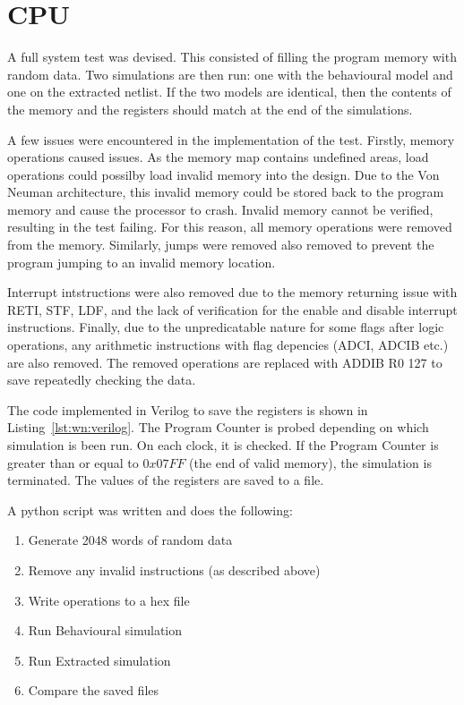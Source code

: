
\section{CPU}

A full system test was devised. 
This consisted of filling the program memory with random data. 
Two simulations are then run: one with the behavioural model and one on the extracted netlist. 
If the two models are identical, then the contents of the memory and the registers should match at the end of the simulations.

A few issues were encountered in the implementation of the test.
Firstly, memory operations caused issues. 
As the memory map contains undefined areas, load operations could possilby load invalid memory into the design.
Due to the Von Neuman architecture, this invalid memory could be stored back to the program memory and cause the processor to crash. 
Invalid memory cannot be verified, resulting in the test failing. 
For this reason, all memory operations were removed from the memory.
Similarly, jumps were removed also removed to prevent the program jumping to an invalid memory location. 

Interrupt intstructions were also removed due to the memory returning issue with RETI, STF, LDF, and the lack of verification for the enable and disable interrupt instructions. 
Finally, due to the unpredicatable nature for some flags after logic operations, any arithmetic instructions with flag depencies (ADCI, ADCIB etc.) are also removed. 
The removed operations are replaced with ADDIB R0 127 to save repeatedly checking the data. 

The code implemented in Verilog to save the registers is shown in Listing~\ref{lst:wn:verilog}.
The Program Counter is probed depending on which simulation is been run.
On each clock, it is checked.
If the Program Counter is greater than or equal to $0x07FF$ (the end of valid memory), the simulation is terminated.
The values of the registers are saved to a file. 

A python script was written and does the following:
\begin{enumerate}
\item Generate 2048 words of random data
\item Remove any invalid instructions (as described above)
\item Write operations to a hex file
\item Run Behavioural simulation
\item Run Extracted simulation
\item Compare the saved files
\end{enumerate}

